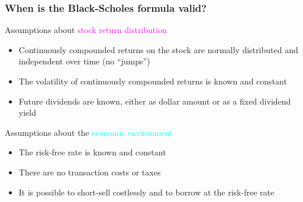 \begin{frame}[fragile,t]
	\frametitle{When is the Black-Scholes formula valid?}

	Assumptions about \textcolor{magenta}{stock return distribution}
\bigskip
\begin{itemize}
	\item Continuously compounded returns on the stock are normally distributed and independent over time (no “jumps”)
	\item The volatility of continuously compounded returns is known and constant
	\item Future dividends are known, either as dollar amount or as a fixed dividend yield
\end{itemize}

\pause
\bigskip
\mySeparateLine
\bigskip

Assumptions about the \textcolor{cyan}{economic environment}
\bigskip

\begin{itemize}
	\item The risk-free rate is known and constant
	\item There are no transaction costs or taxes
	\item It is possible to short-sell costlessly and to borrow at the risk-free rate
\end{itemize}
\end{frame}
